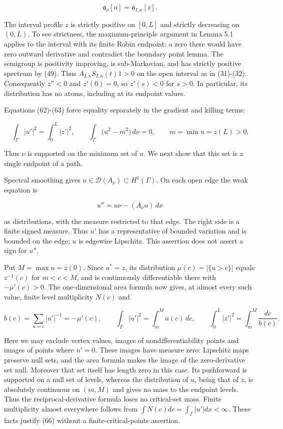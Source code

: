 \documentclass[11pt]{article}
\begin{document}
\[
\mathfrak a_\nu[u]=\mathfrak a_{I,\kappa}[z].
\tag{63}
\]

The interval profile \(z\) is strictly positive on \([0,L]\) and
strictly decreasing on \((0,L)\). To see strictness, the
maximum-principle argument in Lemma 5.1 applies to the interval with its
finite Robin endpoint: a zero there would have zero outward derivative
and contradict the boundary point lemma. The semigroup is positivity
improving, is sub-Markovian, and has strictly positive spectrum by (49).
Thus \(A_{I,\kappa}S_{I,\kappa}(t)1>0\) on the open interval as in
(31)-(32). Consequently \(z''<0\) and \(z'(0)=0\), so \(z'(s)<0\) for
\(s>0\). In particular, its distribution has no atoms, including at its
endpoint values.

Equations (62)-(63) force equality separately in the gradient and
killing terms:

\[
\int_\Gamma|u'|^2=\int_0^L|z'|^2,
\qquad
\int_\Gamma\bigl(u^2-m^2\bigr)\,d\nu=0,
\qquad m=\min u=z(L)>0.
\tag{64}
\]

Thus \(\nu\) is supported on the minimum set of \(u\). We next show that
this set is a single endpoint of a path.

Spectral smoothing gives \(u\in\mathcal D(A_\nu)\subset H^1(\Gamma)\).
On each open edge the weak equation is

\[
u''=u\nu-(A_\nu u)\,dx
\tag{65}
\]

as distributions, with the measure restricted to that edge. The right
side is a finite signed measure. Thus \(u'\) has a representative of
bounded variation and is bounded on the edge; \(u\) is edgewise
Lipschitz. This assertion does not assert a sign for \(u''\).

Put \(M=\max u=z(0)\). Since \(u^*=z\), its distribution
\(\mu(c)=|\{u>c\}|\) equals \(z^{-1}(c)\) for \(m<c<M\), and is
continuously differentiable there with \(-\mu'(c)>0\). The
one-dimensional area formula now gives, at almost every such value,
finite level multiplicity \(N(c)\) and

\[
b(c)=\sum_{u=c}|u'|^{-1}=-\mu'(c),
\qquad
\int_\Gamma|u'|^2=\int_m^M a(c)\,dc,
\qquad
\int_0^L|z'|^2=\int_m^M\frac{dc}{b(c)}.
\tag{66}
\]

Here we may exclude vertex values, images of nondifferentiability points
and images of points where \(u'=0\). These images have measure zero:
Lipschitz maps preserve null sets, and the area formula makes the image
of the zero-derivative set null. Moreover that set itself has length
zero in this case. Its pushforward is supported on a null set of levels,
whereas the distribution of \(u\), being that of \(z\), is absolutely
continuous on \((m,M)\) and gives no mass to the endpoint levels. Thus
the reciprocal-derivative formula loses no critical-set mass. Finite
multiplicity almost everywhere follows from
\(\int N(c)dc=\int_\Gamma|u'|dx<\infty\). These facts justify (66)
without a finite-critical-points assertion.
\end{document}

